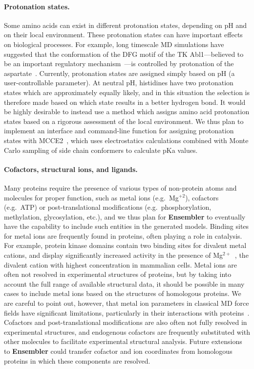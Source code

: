 \documentclass[10pt,letterpaper]{article}
\begin{document}
\paragraph{Protonation states.}
Some amino acids can exist in different protonation states, depending on pH and on their local environment.
These protonation states can have important effects on biological processes.
For example, long timescale MD simulations have suggested that the conformation of the DFG motif of the TK Abl1---believed to be an important regulatory mechanism~\cite{nagar:cell:2003:abl-1opl}---is controlled by protonation of the aspartate~\cite{shan:pnas:2009:abl}.
Currently, protonation states are assigned simply based on pH (a user-controllable parameter).
At neutral pH, histidines have two protonation states which are approximately equally likely, and in this situation the selection is therefore made based on which state results in a better hydrogen bond.
It would be highly desirable to instead use a method which assigns amino acid protonation states based on a rigorous assessment of the local environment.
We thus plan to implement an interface and command-line function for assigning protonation states with MCCE2~\cite{alexov-gunner:biophys-j:1997:mcce2,georgescu-alexov-gunner:biophys-j:2002:mcce2,song-mao-gunner:j-comput-chem:2009:mcce2}, which uses electrostatics calculations combined with Monte Carlo sampling of side chain conformers to calculate pKa values.

\paragraph{Cofactors, structural ions, and ligands.}
Many proteins require the presence of various types of non-protein atoms and molecules for proper function, such as metal ions (e.g.~Mg$^{+2}$), cofactors (e.g.~ATP) or post-translational modifications (e.g.~phosphorylation, methylation, glycosylation, etc.), and we thus plan for {\bf Ensembler} to eventually have the capability to include such entities in the generated models.
Binding sites for metal ions are frequently found in proteins, often playing a role in catalysis.
For example, protein kinase domains contain two binding sites for divalent metal cations, and display significantly increased activity in the presence of Mg$^{2+}$~\cite{adams:prot-sci:1993:kinase-metal-ions}, the divalent cation with highest concentration in mammalian cells.
Metal ions are often not resolved in experimental structures of proteins, but by taking into account the full range of available structural data, it should be possible in many cases to include metal ions based on the structures of homologous proteins.
We are careful to point out, however, that metal ion parameters in classical MD force fields have significant limitations, particularly in their interactions with proteins~\cite{sousa:book:2010:metal-ion-parameters-difficulties}.
Cofactors and post-translational modifications are also often not fully resolved in experimental structures, and endogenous cofactors are frequently substituted with other molecules to facilitate experimental structural analysis.
Future extensions to {\bf Ensembler} could transfer cofactor and ion coordinates from homologous proteins in which these components are resolved.
\end{document}
